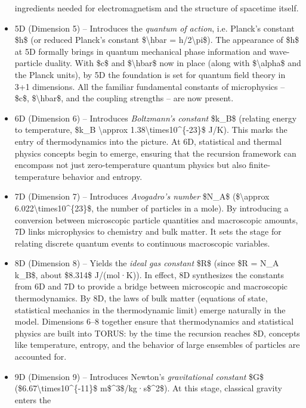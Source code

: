 \documentclass[
]{article}
\begin{document}
\begin{itemize}
  ingredients needed for electromagnetism and the structure of spacetime
  itself.
\item
  5D (Dimension 5) -- Introduces the \emph{quantum of action}, i.e.
  Planck's constant \$h\$ (or reduced Planck's constant
  \$\textbackslash hbar = h/2\textbackslash pi\$). The appearance of
  \$h\$ at 5D formally brings in quantum mechanical phase information
  and wave-particle duality. With \$c\$ and \$\textbackslash hbar\$ now
  in place (along with \$\textbackslash alpha\$ and the Planck units),
  by 5D the foundation is set for quantum field theory in 3+1
  dimensions. All the familiar fundamental constants of microphysics --
  \$c\$, \$\textbackslash hbar\$, and the coupling strengths -- are now
  present.
\item
  6D (Dimension 6) -- Introduces \emph{Boltzmann's constant} \$k\_B\$
  (relating energy to temperature, \$k\_B \textbackslash approx
  1.38\textbackslash times10\^{}\{-23\}\$ J/K). This marks the entry of
  thermodynamics into the picture. At 6D, statistical and thermal
  physics concepts begin to emerge, ensuring that the recursion
  framework can encompass not just zero-temperature quantum physics but
  also finite-temperature behavior and entropy.
\item
  7D (Dimension 7) -- Introduces \emph{Avogadro's number} \$N\_A\$
  (\$\textbackslash approx 6.022\textbackslash times10\^{}\{23\}\$, the
  number of particles in a mole). By introducing a conversion between
  microscopic particle quantities and macroscopic amounts, 7D links
  microphysics to chemistry and bulk matter. It sets the stage for
  relating discrete quantum events to continuous macroscopic variables.
\item
  8D (Dimension 8) -- Yields the \emph{ideal gas constant} \$R\$ (since
  \$R = N\_A k\_B\$, about \$8.314\$ J/(mol·K)). In effect, 8D
  synthesizes the constants from 6D and 7D to provide a bridge between
  microscopic and macroscopic thermodynamics. By 8D, the laws of bulk
  matter (equations of state, statistical mechanics in the thermodynamic
  limit) emerge naturally in the model. Dimensions 6--8 together ensure
  that thermodynamics and statistical physics are built into TORUS: by
  the time the recursion reaches 8D, concepts like temperature, entropy,
  and the behavior of large ensembles of particles are accounted for.
\item
  9D (Dimension 9) -- Introduces Newton's \emph{gravitational constant}
  \$G\$ (\$6.67\textbackslash times10\^{}\{-11\}\$
  m\$\^{}3\$/kg·s\$\^{}2\$). At this stage, classical gravity enters the

\end{itemize}
\end{document}
